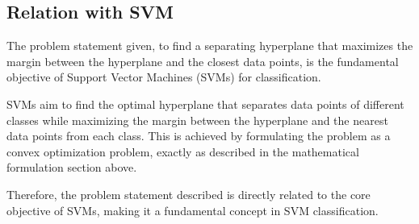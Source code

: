 \documentclass{article}
\begin{document}
\subsection*{Relation with SVM}

\begin{flushleft}
The problem statement given, to find a separating hyperplane that maximizes the margin between the hyperplane and the closest data points, is the fundamental objective of Support Vector Machines (SVMs) for classification.

SVMs aim to find the optimal hyperplane that separates data points of different classes while maximizing the margin between the hyperplane and the nearest data points from each class. This is achieved by formulating the problem as a convex optimization problem, exactly as described in the mathematical formulation section above.

Therefore, the problem statement described is directly related to the core objective of SVMs, making it a fundamental concept in SVM classification.
\end{flushleft}
\end{document}
